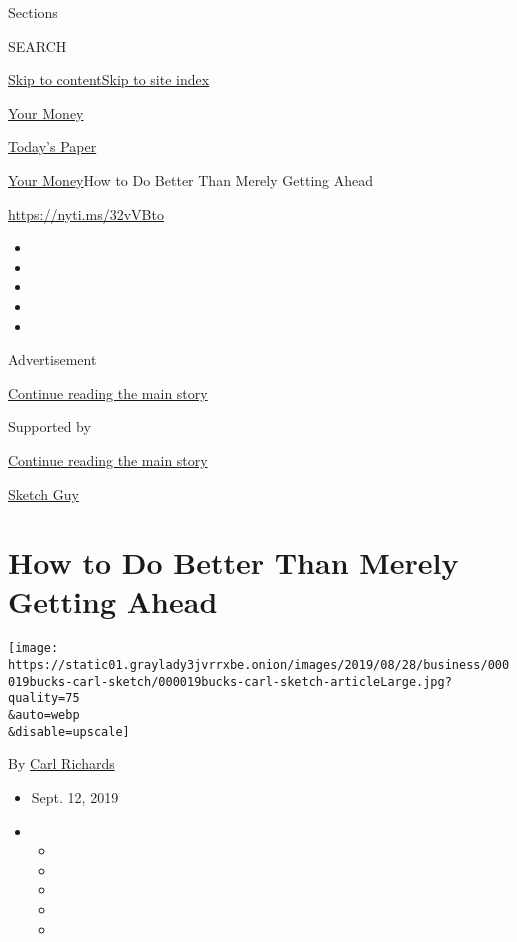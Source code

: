 Sections

SEARCH

\protect\hyperlink{site-content}{Skip to
content}\protect\hyperlink{site-index}{Skip to site index}

\href{https://www.nytimes3xbfgragh.onion/section/your-money}{Your Money}

\href{https://myaccount.nytimes3xbfgragh.onion/auth/login?response_type=cookie\&client_id=vi}{}

\href{https://www.nytimes3xbfgragh.onion/section/todayspaper}{Today's
Paper}

\href{/section/your-money}{Your Money}\textbar{}How to Do Better Than
Merely Getting Ahead

\url{https://nyti.ms/32vVBto}

\begin{itemize}
\item
\item
\item
\item
\item
\end{itemize}

Advertisement

\protect\hyperlink{after-top}{Continue reading the main story}

Supported by

\protect\hyperlink{after-sponsor}{Continue reading the main story}

\href{/column/sketch-guy}{Sketch Guy}

\hypertarget{how-to-do-better-than-merely-getting-ahead}{%
\section{How to Do Better Than Merely Getting
Ahead}\label{how-to-do-better-than-merely-getting-ahead}}

\texttt{[image: https://static01.graylady3jvrrxbe.onion/images/2019/08/28/business/000019bucks-carl-sketch/000019bucks-carl-sketch-articleLarge.jpg?quality=75\\\&auto=webp\\\&disable=upscale]}

By \href{https://www.nytimes3xbfgragh.onion/by/carl-richards}{Carl
Richards}

\begin{itemize}
\item
  Sept. 12, 2019
\item
  \begin{itemize}
  \item
  \item
  \item
  \item
  \item
  \end{itemize}
\end{itemize}

